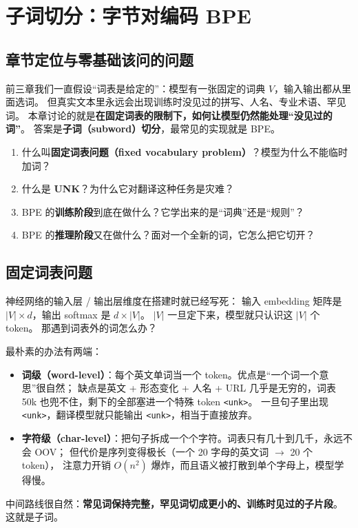 \section{子词切分：字节对编码 BPE}

\subsection{章节定位与零基础该问的问题}

前三章我们一直假设“词表是给定的”：模型有一张固定的词典 $V$，输入输出都从里面选词。
但真实文本里永远会出现训练时没见过的拼写、人名、专业术语、罕见词。
本章讨论的就是\textbf{在固定词表的限制下，如何让模型仍然能处理“没见过的词”}。
答案是\textbf{子词（subword）切分}，最常见的实现就是 BPE。

\begin{problemblock}[零基础读者该追问的四个问题]
\begin{enumerate}
    \item 什么叫\textbf{固定词表问题（fixed vocabulary problem）}？模型为什么不能临时加词？
    \item 什么是 \textbf{UNK}？为什么它对翻译这种任务是灾难？
    \item BPE 的\textbf{训练阶段}到底在做什么？它学出来的是“词典”还是“规则”？
    \item BPE 的\textbf{推理阶段}又在做什么？面对一个全新的词，它怎么把它切开？
\end{enumerate}
\end{problemblock}

\subsection{固定词表问题}

\begin{problemblock}[问题]
神经网络的输入层 / 输出层维度在搭建时就已经写死：
输入 embedding 矩阵是 $|V|\times d$，输出 softmax 是 $d\times|V|$。
$|V|$ 一旦定下来，模型就只认识这 $|V|$ 个 token。
那遇到词表外的词怎么办？
\end{problemblock}

\begin{intuitionblock}[朴素直觉]
最朴素的办法有两端：
\begin{itemize}
    \item \textbf{词级（word-level）}：每个英文单词当一个 token。优点是“一个词一个意思”很自然；
          缺点是英文 + 形态变化 + 人名 + URL 几乎是无穷的，词表 50k 也兜不住，剩下的全部塞进一个特殊 token \texttt{<unk>}。
          一旦句子里出现 \texttt{<unk>}，翻译模型就只能输出 \texttt{<unk>}，相当于直接放弃。
    \item \textbf{字符级（char-level）}：把句子拆成一个个字符。词表只有几十到几千，永远不会 OOV；
          但代价是序列变得极长（一个 20 字母的英文词 $\to$ 20 个 token），
          注意力开销 $O(n^2)$ 爆炸，而且语义被打散到单个字母上，模型学得慢。
\end{itemize}
中间路线很自然：\textbf{常见词保持完整，罕见词切成更小的、训练时见过的子片段}。
这就是子词。
\end{intuitionblock}

